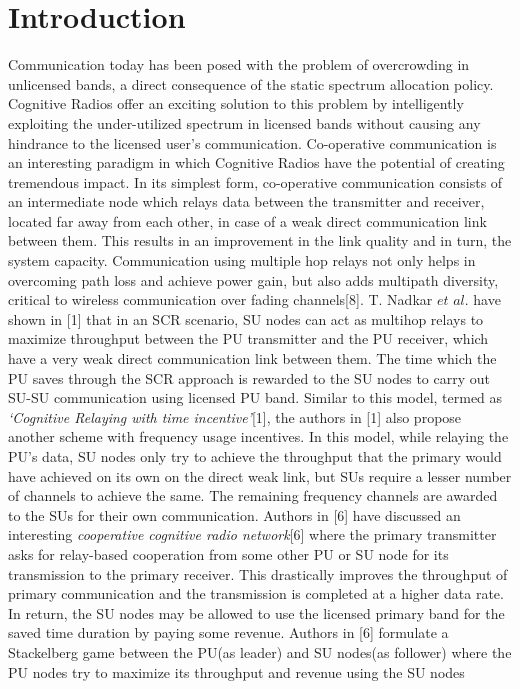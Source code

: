 \documentclass[conference]{IEEEtran}
\begin{document}
\section{Introduction}
Communication today has been posed with the problem of overcrowding in unlicensed bands, a direct consequence of the static spectrum allocation policy. Cognitive Radios offer an exciting 
solution to this problem by intelligently exploiting the under-utilized spectrum in licensed bands without causing any hindrance to
the licensed user’s communication. Co-operative communication is an interesting paradigm in which Cognitive Radios have the potential of creating tremendous 
impact. In its simplest form, co-operative communication consists of an intermediate node which relays data between 
the transmitter and receiver, located far away from each other, in case of a weak direct communication link between them. This results in an improvement in the link quality and in turn, the 
system capacity. Communication using multiple hop relays not only helps in overcoming path loss and achieve power gain, but 
also adds multipath diversity, critical to wireless communication over fading channels[8]. T. Nadkar $\textit{et al.}$
have shown in [1] that in an SCR scenario, SU nodes can act as multihop
relays to maximize throughput between the PU transmitter and the PU receiver, which have a very weak direct communication link between them. The time which the PU saves through the 
SCR approach is rewarded to the SU nodes to carry out SU-SU communication using
licensed PU band. Similar to this model, termed as \textit{`Cognitive Relaying with time incentive'}[1], the authors in [1] also propose another 
scheme with frequency usage incentives. In this model, while relaying the PU's data, SU nodes only try to achieve the throughput that the primary would have 
achieved on its own on the direct weak link, but SUs require a lesser number of channels to achieve the same. The remaining frequency channels are awarded to the SUs for their own 
communication. Authors in [6] have discussed an interesting \textit{cooperative cognitive radio network}[6] 
where the primary transmitter asks for relay-based cooperation from some other PU or SU node for its transmission to the primary 
receiver. This drastically improves the throughput of primary communication and the transmission is completed at a higher data rate.
In return, the SU nodes may be allowed to use the licensed primary band for the saved time duration by paying some revenue. 
Authors in [6] formulate a Stackelberg game between the PU(as leader) and SU nodes(as follower) where the PU nodes try to maximize its throughput and revenue using the SU nodes 
\end{document}

